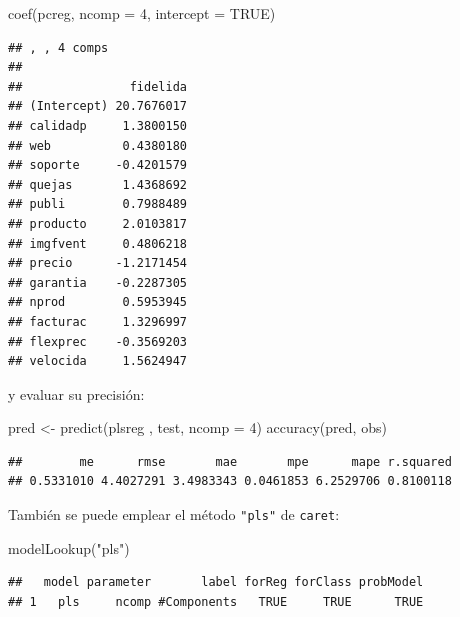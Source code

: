 \documentclass[
  spanish,
]{book}
\newenvironment{Shaded}{\begin{snugshade}}{\end{snugshade}}
\newcommand{\AttributeTok}[1]{\textcolor[rgb]{0.77,0.63,0.00}{#1}}
\newcommand{\ConstantTok}[1]{\textcolor[rgb]{0.00,0.00,0.00}{#1}}
\newcommand{\DecValTok}[1]{\textcolor[rgb]{0.00,0.00,0.81}{#1}}
\newcommand{\FunctionTok}[1]{\textcolor[rgb]{0.00,0.00,0.00}{#1}}
\newcommand{\NormalTok}[1]{#1}
\newcommand{\OtherTok}[1]{\textcolor[rgb]{0.56,0.35,0.01}{#1}}
\newcommand{\StringTok}[1]{\textcolor[rgb]{0.31,0.60,0.02}{#1}}
\theoremstyle{break}
\theoremstyle{definition}
\theoremstyle{definition}
\theoremstyle{definition}
\theoremstyle{definition}
\theoremstyle{remark}
\begin{document}
\begin{Shaded}
\begin{Highlighting}[]
\FunctionTok{coef}\NormalTok{(pcreg, }\AttributeTok{ncomp =} \DecValTok{4}\NormalTok{, }\AttributeTok{intercept =} \ConstantTok{TRUE}\NormalTok{)}
\end{Highlighting}
\end{Shaded}

\begin{verbatim}
## , , 4 comps
## 
##               fidelida
## (Intercept) 20.7676017
## calidadp     1.3800150
## web          0.4380180
## soporte     -0.4201579
## quejas       1.4368692
## publi        0.7988489
## producto     2.0103817
## imgfvent     0.4806218
## precio      -1.2171454
## garantia    -0.2287305
## nprod        0.5953945
## facturac     1.3296997
## flexprec    -0.3569203
## velocida     1.5624947
\end{verbatim}

y evaluar su precisión:

\begin{Shaded}
\begin{Highlighting}[]
\NormalTok{pred }\OtherTok{\textless{}{-}} \FunctionTok{predict}\NormalTok{(plsreg , test, }\AttributeTok{ncomp =} \DecValTok{4}\NormalTok{)}
\FunctionTok{accuracy}\NormalTok{(pred, obs)}
\end{Highlighting}
\end{Shaded}

\begin{verbatim}
##        me      rmse       mae       mpe      mape r.squared 
## 0.5331010 4.4027291 3.4983343 0.0461853 6.2529706 0.8100118
\end{verbatim}

También se puede emplear el método \texttt{"pls"} de \texttt{caret}:

\begin{Shaded}
\begin{Highlighting}[]
\FunctionTok{modelLookup}\NormalTok{(}\StringTok{"pls"}\NormalTok{)}
\end{Highlighting}
\end{Shaded}

\begin{verbatim}
##   model parameter       label forReg forClass probModel
## 1   pls     ncomp #Components   TRUE     TRUE      TRUE
\end{verbatim}
\end{document}
